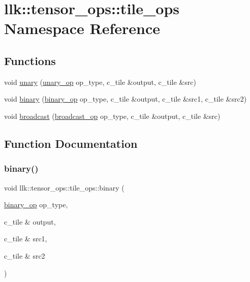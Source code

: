\hypertarget{namespacellk_1_1tensor__ops_1_1tile__ops}{}\section{llk\+:\+:tensor\+\_\+ops\+:\+:tile\+\_\+ops Namespace Reference}
\label{namespacellk_1_1tensor__ops_1_1tile__ops}
\subsection*{Functions}
\begin{DoxyCompactItemize}
\item 
void \hyperlink{namespacellk_1_1tensor__ops_1_1tile__ops_a3d2947958d24366977b0b37efe452d59}{unary} (\hyperlink{namespacellk_1_1tensor__ops_a5fae70cbcf6cd7aadca4a04278614633}{unary\+\_\+op} op\+\_\+type, c\+\_\+tile \&output, c\+\_\+tile \&src)
\item 
void \hyperlink{namespacellk_1_1tensor__ops_1_1tile__ops_a5f2a572a14748454f5a2da127995b8d2}{binary} (\hyperlink{namespacellk_1_1tensor__ops_a255b8a4e49bc956c2731c62bf613c0f8}{binary\+\_\+op} op\+\_\+type, c\+\_\+tile \&output, c\+\_\+tile \&src1, c\+\_\+tile \&src2)
\item 
void \hyperlink{namespacellk_1_1tensor__ops_1_1tile__ops_a63bea211ae34a5de923fa501c849f16c}{broadcast} (\hyperlink{namespacellk_1_1tensor__ops_ac43a7c3eb367c669baaa45a327aeca58}{broadcast\+\_\+op} op\+\_\+type, c\+\_\+tile \&output, c\+\_\+tile \&src)
\end{DoxyCompactItemize}


\subsection{Function Documentation}
\mbox{\label{namespacellk_1_1tensor__ops_1_1tile__ops_a5f2a572a14748454f5a2da127995b8d2}} 
\subsubsection{\texorpdfstring{binary()}{binary()}}
{\footnotesize\ttfamily void llk\+::tensor\+\_\+ops\+::tile\+\_\+ops\+::binary (\begin{DoxyParamCaption}\item[{\hyperlink{namespacellk_1_1tensor__ops_a255b8a4e49bc956c2731c62bf613c0f8}{binary\+\_\+op}}]{op\+\_\+type,  }\item[{c\+\_\+tile \&}]{output,  }\item[{c\+\_\+tile \&}]{src1,  }\item[{c\+\_\+tile \&}]{src2 }\end{DoxyParamCaption})}

